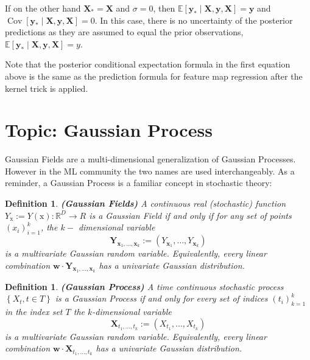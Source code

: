 \documentclass[11pt]{article}
\theoremstyle{plain} %
\newtheorem{definition}[theorem]{Definition}
\theoremstyle{remark}
\begin{document}
If on the other hand $\mathbf{X}_{*}=\mathbf{X}$ and $\sigma=0$, then
$\mathbb{E}\left[\mathbf{y}_{*} \mid \mathbf{X}, \mathbf{y},
    \mathbf{X}\right]=\mathbf{y}$ and $\operatorname{Cov}\left[\mathbf{y}_{*} \mid
    \mathbf{X}, \mathbf{y}, \mathbf{X}\right]=0$. In this case, there is no uncertainty of the
posterior predictions as they are assumed to equal the prior observations,
$\mathbb{E}\left[\mathbf{y}_{*} \mid \mathbf{X}, \mathbf{y},
    \mathbf{X}\right]=y$.

Note that the posterior conditional expectation formula in the first equation
above is the same as the prediction formula for feature map regression after
the kernel trick is applied.

\section{Topic: Gaussian Process}

Gaussian Fields are a multi-dimensional generalization of Gaussian Processes.
However in the ML community the two names are used interchangeably. As a
reminder, a Gaussian Process is a familiar concept in stochastic theory:

\begin{definition}\textbf{(Gaussian Fields)}
  A continuous real (stochastic) function $Y_{\mathrm{x}}:=Y(\mathrm{x}):
    \mathbb{R}^{D} \rightarrow R$ is a Gaussian Field if and only if for any set of
  points $\left(x_{i}\right)_{i=1}^{k}$, the $k-$ dimensional variable
  $$
    \mathbf{Y}_{\mathbf{x}_{1}, \ldots, \mathbf{x}_{k}}:=\left(Y_{\mathbf{x}_{1}}, \ldots, Y_{\mathbf{x}_{k}}\right)
  $$
  is a multivariate Gaussian random variable. Equivalently, every linear
  combination $\mathbf{w} \cdot \mathbf{Y}_{\mathbf{x}_{1}, \ldots,
    \mathbf{x}_{k}}$ has a univariate Gaussian distribution.
\end{definition}

\begin{definition}\textbf{(Gaussian Process)}
  A time continuous stochastic process $\left\{X_{t}, t \in T\right\}$ is a
  Gaussian Process if and only for every set of indices
  $\left(t_{i}\right)_{k=1}^{k}$ in the index set $T$ the $k$-dimensional variable
  $$
    \mathbf{X}_{t_{1}, \ldots, t_{k}}:=\left(X_{t_{1}}, \ldots, X_{t_{k}}\right)
  $$
  is a multivariate Gaussian random variable. Equivalently, every linear
  combination $\mathbf{w} \cdot \mathbf{X}_{t_{1}, \ldots, t_{k}}$ has a
  univariate Gaussian distribution.
\end{definition}
\end{document}
